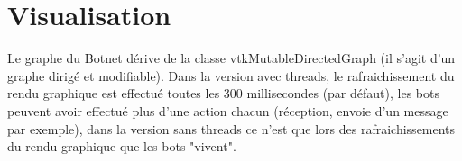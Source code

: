 \documentclass[11pt]{article}
\begin{document}
\section{Visualisation}
Le graphe du Botnet dérive de la classe vtkMutableDirectedGraph (il s'agit d'un graphe dirigé et modifiable). Dans la version avec threads, le rafraichissement du rendu graphique est effectué toutes les 300 millisecondes (par défaut), les bots peuvent avoir effectué plus d'une action chacun (réception, envoie d'un message par exemple), dans la version sans threads ce n'est que lors des rafraichissements du rendu graphique que les bots "vivent".
\end{document}
